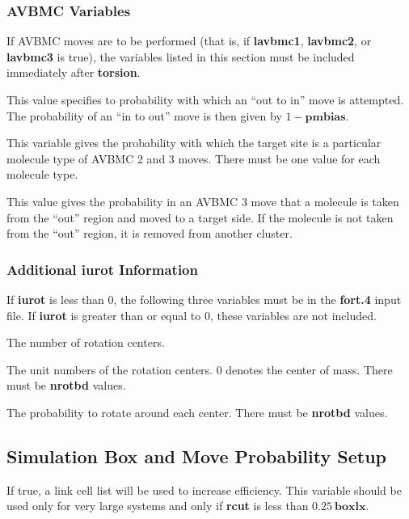 \documentclass[12pt,letterpaper]{article}
\begin{document}
\subsubsection{AVBMC Variables}
\label{avbmc_vars}

If AVBMC moves are to be performed (that is, if {\textbf{lavbmc1}}, {\textbf{lavbmc2}},
or {\textbf{lavbmc3}} is true), the variables listed in this section must be included immediately after {\bf torsion}.

 This value specifies to probability with which an 
``out to in'' move is attempted.  The probability of an ``in to out'' move is then given by 
$1 - {\textbf{pmbias}}$.

 This variable gives the probability with which the target site 
is a particular molecule type of AVBMC 2 and 3 moves.
There must be one value for each molecule type.

 This value gives the probability in an AVBMC 3 move
that a molecule is taken from the ``out'' region and moved to a target side.  If the molecule is not taken
from the ``out'' region, it is removed from another cluster.

\subsubsection{Additional {\bf iurot} Information}
If {\bf iurot} is less than 0, the following three variables must be in the {\bf fort.4} input file.
If {\bf iurot} is greater than or equal to 0, these variables are not included.

 The number of rotation centers.

 The unit numbers of the rotation centers.  0 denotes the center of mass.
There must be {\bf nrotbd} values.

 The probability to rotate around each center.
There must be {\bf nrotbd} values.

\subsection{Simulation Box and Move Probability Setup}

 If true, a link cell list will be used to increase efficiency.  
This variable should be used only for very large systems and only if 
{\textbf{rcut}} is less than $0.25~{\textbf{boxlx}}$.
\end{document}
